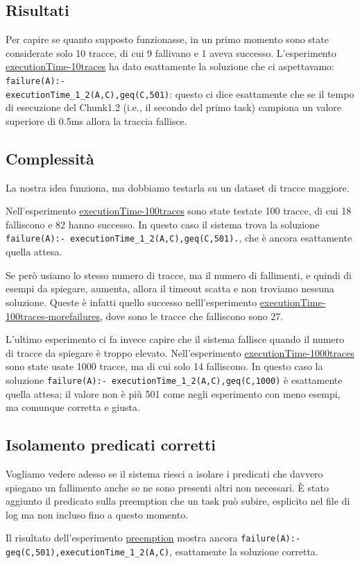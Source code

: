 \subsection{Risultati}
Per capire se quanto supposto funzionasse, in un primo momento sono state considerate solo 10 tracce, di cui 9 fallivano e 1 aveva successo. L'esperimento \href{https://github.com/edoardosarri24/prediction-in-data-driven-system/8-executionTime-10traces/}{executionTime-10traces} ha dato esattamente la soluzione che ci aspettavamo: \texttt{failure(A):- \\ executionTime\_1\_2(A,C),geq(C,501)}: questo ci dice esattamente che se il tempo di esecuzione del Chunk1.2 (i.e., il secondo del primo task) campiona un valore superiore di 0.5ms allora la traccia fallisce.

\subsection{Complessità}
La nostra idea funziona, ma dobbiamo testarla su un dataset di tracce maggiore.

Nell'esperimento \href{https://github.com/edoardosarri24/prediction-in-data-driven-system/9-executionTime-100traces/}{executionTime-100traces} sono state testate 100 tracce, di cui 18 falliscono e 82 hanno successo. In questo caso il sistema trova la soluzione \texttt{failure(A):- executionTime\_1\_2(A,C),geq(C,501).}, che è ancora esattamente quella attesa.

Se però usiamo lo stesso numero di tracce, ma il numero di fallimenti, e quindi di esempi da spiegare, aumenta, allora il timeout scatta e non troviamo nessuna soluzione. Queste è infatti quello successo nelll'esperimento \href{https://github.com/edoardosarri24/prediction-in-data-driven-system/10-executionTime-100traces-morefailures/}{executionTime-100traces-morefailures}, dove sono le tracce che falliscono sono 27.

L'ultimo esperimento ci fa invece capire che il sistema fallisce quando il numero di tracce da spiegare è troppo elevato. Nell'esperimento \href{https://github.com/edoardosarri24/prediction-in-data-driven-system/11-executionTime-1000traces/}{executionTime-1000traces} sono state usate 1000 tracce, ma di cui solo 14 falliscono. In questo caso la soluzione \texttt{failure(A):- executionTime\_1\_2(A,C),geq(C,1000)} è esattamente quella attesa; il valore non è più 501 come negli esperimento con meno esempi, ma comunque corretta e giusta.

\subsection{Isolamento predicati corretti}
Vogliamo vedere adesso se il sistema riesci a isolare i predicati che davvero spiegano un fallimento anche se ne sono presenti altri non necessari. È stato aggiunto il predicato sulla preemption che un task può subire, esplicito nel file di log ma non incluso fino a questo momento.

Il risultato dell'esperimento \href{https://github.com/edoardosarri24/prediction-in-data-driven-system/12-preemption/}{preemption} mostra ancora \texttt{failure(A):- \\ geq(C,501),executionTime\_1\_2(A,C)}, esattamente la soluzione corretta.